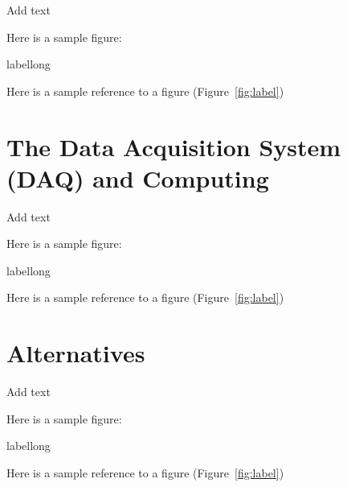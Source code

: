 Add text

Here is a sample figure: 

\begin{cdrfigure}[short]{label}{long}
\end{cdrfigure}


Here is a sample reference to a figure (Figure~\ref{fig:label})


\section{The Data Acquisition System (DAQ) and Computing}
\label{sec:nd-ref-daq-comp}

Add text

Here is a sample figure: 

\begin{cdrfigure}[short]{label}{long}
\end{cdrfigure}


Here is a sample reference to a figure (Figure~\ref{fig:label})

\section{Alternatives}
\label{sec:nd-alt}

Add text

Here is a sample figure: 

\begin{cdrfigure}[short]{label}{long}
\end{cdrfigure}


Here is a sample reference to a figure (Figure~\ref{fig:label})

